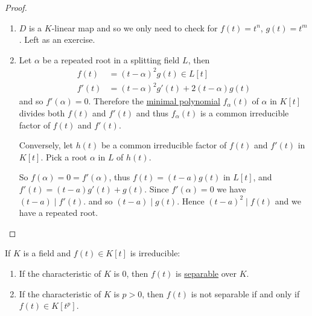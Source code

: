 \documentclass{article}
\begin{document}
\begin{proof}
    \leavevmode
    \begin{enumerate}[label=(\alph*)]
        \item \hyperlink{def:diff}{$D$} is a $K$-linear map and so we only need to check for $f(t) = t^n$, $g(t) = t^m$. Left as an exercise.
        \item Let $\alpha$ be a repeated root in a splitting field $L$, then
            \begin{align*}
                f(t) &= (t-\alpha)^2 g(t) \in L[t] \\
                f'(t) &= (t-\alpha)^2 g'(t) + 2(t-\alpha) g(t)
            \end{align*}
            and so $f'(\alpha) = 0$.
            Therefore the \hyperlink{def:minimalPoly}{minimal polynomial} $f_\alpha(t)$ of $\alpha$ in $K[t]$ divides both $f(t)$ and $f'(t)$ and thus $f_\alpha(t)$ is a common irreducible factor of $f(t)$ and $f'(t)$.


            Conversely, let $h(t)$ be a common irreducible factor of $f(t)$ and $f'(t)$ in $K[t]$.
            Pick a root $\alpha$ in $L$ of $h(t)$.

            So $f(\alpha) = 0 = f'(\alpha)$, thus $f(t) = (t-a) g(t)$ in $L[t]$, and $f'(t) = (t-a) g'(t) + g(t)$.
            Since $f'(\alpha)  = 0$ we have $(t-a) \mid f'(t)$. and so $(t-a) \mid g(t)$. Hence $(t-a)^2 \mid f(t)$ and we have a repeated root. \qedhere
    \end{enumerate}
\end{proof}

\begin{ncor}\label{cor:2.4}
    If $K$ is a field and $f(t) \in K[t]$ is irreducible:
    \begin{enumerate}[label=(\roman*)]
        \item If the characteristic of $K$ is 0, then $f(t)$ is \hyperlink{def:separablePoly}{separable} over $K$.
        \item If the characteristic of $K$ is $p>0$, then $f(t)$ is not separable if and only if $f(t) \in K[t^p]$.
    \end{enumerate}
\end{ncor}
\end{document}
